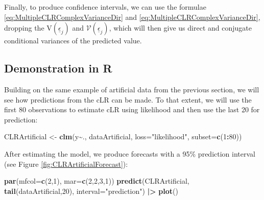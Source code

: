 \documentclass[
]{book}
\newenvironment{Shaded}{\begin{snugshade}}{\end{snugshade}}
\newcommand{\DataTypeTok}[1]{\textcolor[rgb]{0.13,0.29,0.53}{#1}}
\newcommand{\DecValTok}[1]{\textcolor[rgb]{0.00,0.00,0.81}{#1}}
\newcommand{\ErrorTok}[1]{\textcolor[rgb]{0.64,0.00,0.00}{\textbf{#1}}}
\newcommand{\KeywordTok}[1]{\textcolor[rgb]{0.13,0.29,0.53}{\textbf{#1}}}
\newcommand{\NormalTok}[1]{#1}
\newcommand{\OperatorTok}[1]{\textcolor[rgb]{0.81,0.36,0.00}{\textbf{#1}}}
\newcommand{\StringTok}[1]{\textcolor[rgb]{0.31,0.60,0.02}{#1}}
\begin{document}
Finally, to produce confidence intervals, we can use the formulae \eqref{eq:MultipleCLRComplexVarianceDir} and \eqref{eq:MultipleCLRComplexVarianceDir}, dropping the \(\mathrm{V}\left(\underline{\epsilon}_j\right)\) and \(\mathcal{V}\left(\underline{\epsilon}_j\right)\), which will then give us direct and conjugate conditional variances of the predicted value.

\hypertarget{demonstration-in-r-1}{%
\subsection{Demonstration in R}\label{demonstration-in-r-1}}

Building on the same example of artificial data from the previous section, we will see how predictions from the cLR can be made. To that extent, we will use the first 80 observations to estimate cLR using likelihood and then use the last 20 for prediction:

\begin{Shaded}
\begin{Highlighting}[]
\NormalTok{CLRArtificial \textless{}{-}}\StringTok{ }\KeywordTok{clm}\NormalTok{(y}\OperatorTok{\textasciitilde{}}\NormalTok{., dataArtificial,}
                     \DataTypeTok{loss=}\StringTok{"likelihood"}\NormalTok{, }\DataTypeTok{subset=}\KeywordTok{c}\NormalTok{(}\DecValTok{1}\OperatorTok{:}\DecValTok{80}\NormalTok{))}
\end{Highlighting}
\end{Shaded}

After estimating the model, we produce forecasts with a 95\% prediction interval (see Figure \ref{fig:CLRArtificialForecast}):

\begin{Shaded}
\begin{Highlighting}[]
\KeywordTok{par}\NormalTok{(}\DataTypeTok{mfcol=}\KeywordTok{c}\NormalTok{(}\DecValTok{2}\NormalTok{,}\DecValTok{1}\NormalTok{), }\DataTypeTok{mar=}\KeywordTok{c}\NormalTok{(}\DecValTok{2}\NormalTok{,}\DecValTok{2}\NormalTok{,}\DecValTok{3}\NormalTok{,}\DecValTok{1}\NormalTok{))}
\KeywordTok{predict}\NormalTok{(CLRArtificial, }\KeywordTok{tail}\NormalTok{(dataArtificial,}\DecValTok{20}\NormalTok{),}
        \DataTypeTok{interval=}\StringTok{"prediction"}\NormalTok{) }\OperatorTok{|}\ErrorTok{\textgreater{}}
\StringTok{    }\KeywordTok{plot}\NormalTok{()}
\end{Highlighting}
\end{Shaded}
\end{document}
